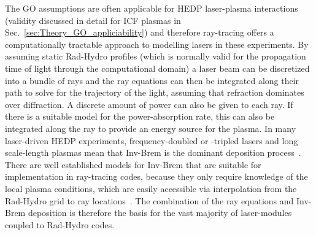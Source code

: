 The \ac{GO} assumptions are often applicable for \ac{HEDP} laser-plasma interactions (validity discussed in detail for \ac{ICF} plasmas in Sec.~\ref{sec:Theory_GO_appliciability}) and therefore ray-tracing offers a computationally tractable approach to modelling lasers in these experiments.
By assuming static \ac{Rad-Hydro} profiles (which is normally valid for the propagation time of light through the computational domain) a laser beam can be discretized into a bundle of rays and the ray equations can then be integrated along their path to solve for the trajectory of the light, assuming that refraction dominates over diffraction.
A discrete amount of power can also be given to each ray.
If there is a suitable model for the power-absorption rate, this can also be integrated along the ray to provide an energy source for the plasma.
In many laser-driven \ac{HEDP} experiments, frequency-doubled or -tripled lasers and long scale-length plasmas mean that \ac{Inv-Brem} is the dominant deposition process~\cite{schmitt_importance_2023,schmitt_importance_2023-1}.
There are well established models for \ac{Inv-Brem} that are suitable for implementation in ray-tracing codes, because they only require knowledge of the local plasma conditions, which are easily accessible via interpolation from the \ac{Rad-Hydro} grid to ray locations~\cite{huba_nrl_2013,johnston_correct_1973}.
The combination of the ray equations and \ac{Inv-Brem} deposition is therefore the basis for the vast majority of laser-modules coupled to \ac{Rad-Hydro} codes.

